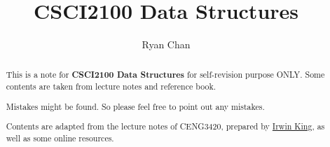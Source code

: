 \documentclass[a4paper]{report}
\author{Ryan Chan}
\title{CSCI2100 Data Structures}
\begin{document}
\setlength\parindent{0pt}

\maketitle

\newpage

\begin{abstract}
	This is a note for \textbf{CSCI2100 Data Structures} for self-revision purpose ONLY. Some contents are taken from lecture notes and reference book.
	
	Mistakes might be found. So please feel free to point out any mistakes.
	
	Contents are adapted from the lecture notes of CENG3420, prepared by \href{https://www.cse.cuhk.edu.hk/irwin.king/}{Irwin King}, as well as some online resources. 
\end{abstract}

\newpage

\tableofcontents

\setlength{\parskip}{5pt}
\end{document}
